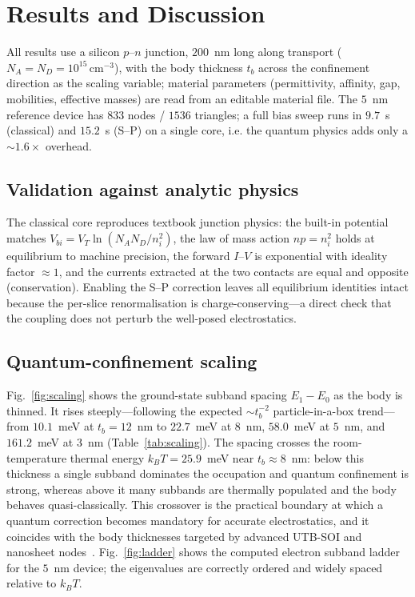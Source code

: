 \documentclass[conference]{IEEEtran}
\begin{document}
\section{Results and Discussion}
\label{sec:results}
All results use a silicon $p$--$n$ junction, $200$~nm long along transport
($N_A=N_D=10^{15}\,\mathrm{cm^{-3}}$), with the body thickness $t_b$ across the
confinement direction as the scaling variable; material parameters (permittivity,
affinity, gap, mobilities, effective masses) are read from an editable material
file. The $5$~nm reference device has $833$ nodes / $1536$ triangles; a full bias
sweep runs in $9.7$~s (classical) and $15.2$~s (S--P) on a single core, i.e. the
quantum physics adds only a $\sim\!1.6\times$ overhead.

\subsection{Validation against analytic physics}
The classical core reproduces textbook junction physics: the built-in potential
matches $V_{bi}=V_T\ln(N_AN_D/n_i^2)$, the law of mass action $np=n_i^2$ holds at
equilibrium to machine precision, the forward $I$--$V$ is exponential with
ideality factor $\approx1$, and the currents extracted at the two contacts are
equal and opposite (conservation). Enabling the S--P correction leaves all
equilibrium identities intact because the per-slice renormalisation is
charge-conserving---a direct check that the coupling does not perturb the
well-posed electrostatics.

\subsection{Quantum-confinement scaling}
Fig.~\ref{fig:scaling} shows the ground-state subband spacing $E_1-E_0$ as the
body is thinned. It rises steeply---following the expected
$\sim\!t_b^{-2}$ particle-in-a-box trend---from $10.1$~meV at $t_b=12$~nm to
$22.7$~meV at $8$~nm, $58.0$~meV at $5$~nm, and $161.2$~meV at $3$~nm
(Table~\ref{tab:scaling}). The spacing crosses the room-temperature thermal
energy $k_BT=25.9$~meV near $t_b\approx8$~nm: below this thickness a single
subband dominates the occupation and quantum confinement is strong, whereas above
it many subbands are thermally populated and the body behaves quasi-classically.
This crossover is the practical boundary at which a quantum correction becomes
mandatory for accurate electrostatics, and it coincides with the body thicknesses
targeted by advanced UTB-SOI and nanosheet nodes~\cite{colinge,irds}.
Fig.~\ref{fig:ladder} shows the computed electron subband ladder for the $5$~nm
device; the eigenvalues are correctly ordered and widely spaced relative to $k_BT$.
\end{document}
